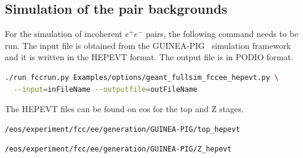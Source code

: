 \subsection{Simulation of the pair backgrounds}
For the simulation of incoherent $e^+e^-$ pairs, the following command needs to be run. The input file is obtained from the \textsc{GUINEA-PIG}~\cite{Schulte:382453} simulation framework and it is written in the \textsc{HEPEVT} format. The output file is in \textsc{PODIO} format.

\begin{lstlisting}[language=bash,caption={Simulation of the incoherent pair background.}]
  ./run fccrun.py Examples/options/geant_fullsim_fccee_hepevt.py \
  --input=inFileName --outputfile=outFileName
\end{lstlisting}


The \textsc{HEPEVT} files can be found on eos for the top and Z stages.
\begin{lstlisting}[language=bash,caption={Location of the background hits for the top stage.}]
  /eos/experiment/fcc/ee/generation/GUINEA-PIG/top_hepevt
\end{lstlisting}

\begin{lstlisting}[language=bash,caption={Location of the background hits for the Z stage.}]
  /eos/experiment/fcc/ee/generation/GUINEA-PIG/Z_hepevt
\end{lstlisting}
